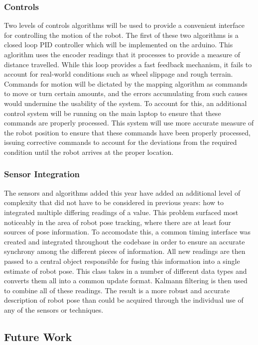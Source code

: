 \subsubsection{Controls}
Two levels of controls algorithms will be used to provide a convenient interface for controlling the motion of the robot. The first of these two algorithms is a closed loop PID controller which will be implemented on the arduino. This aglorithm uses the encoder readings that it processes to provide a measure of distance travelled. While this loop provides a fast feedback mechanism, it fails to account for real-world conditions such as wheel slippage and rough terrain. Commands for motion will be dictated by the mapping algorithm as commands to move or turn certain amounts, and the errors accumulating from such causes would undermine the usability of the system. To account for this, an additional control system will be running on the main laptop to ensure that these commands are properly processed. This system will use more accurate measure of the robot position to ensure that these commands have been properly processed, issuing corrective commands to account for the deviations from the required condition until the robot arrives at the proper location.
\subsubsection{Sensor Integration}
The sensors and algorithms added this year have added an additional level of complexity that did not have to be considered in previous years: how to integrated multiple differing readings of a value. This problem surfaced most noticeably in the area of robot pose tracking, where there are at least four sources of pose information. To accomodate this, a common timing interface was created and integrated throughout the codebase in order to ensure an accurate synchrony among the different pieces of information. All new readings are then passed to a central object responsible for fusing this information into a single estimate of robot pose. This class takes in a number of different data types and converts them all into a common update format. Kalmann filtering is then used to combine all of these readings. The result is a more robust and accurate description of robot pose than could be acquired through the individual use of any of the sensors or techniques.
\subsection{Future Work}


